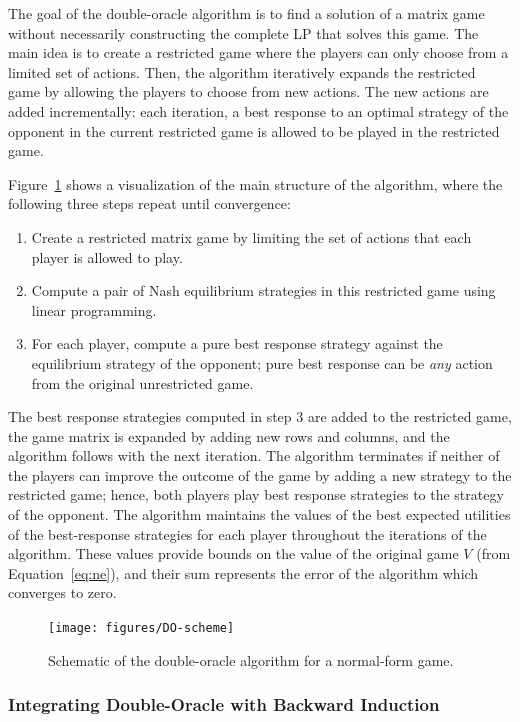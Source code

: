 The goal of the double-oracle algorithm is to find a solution of a matrix game without necessarily constructing the complete LP that solves this game.
The main idea is to create a restricted game where the players can only choose from a limited set of actions.
Then, the algorithm iteratively expands the restricted game by allowing the players to choose from new actions.
The new actions are added incrementally: each iteration, a best response to an optimal strategy of the opponent in the current restricted game is
allowed to be played in the restricted game.

Figure~\ref{fig:do-scheme} shows a visualization of the main structure of the algorithm, where the following three steps repeat until convergence:
\begin{enumerate}
\item Create a restricted matrix game by limiting the set of actions that each player is allowed to play.
\item Compute a pair of Nash equilibrium strategies in this restricted game using linear programming.
\item For each player, compute a pure best response strategy against the equilibrium strategy of the opponent; pure best response can be \emph{any} action from the original unrestricted game.
\end{enumerate}
The best response strategies computed in step 3 are added to the restricted game, the game matrix is expanded by adding new rows and columns, and the algorithm follows with the next iteration. The algorithm terminates if neither of the players can improve the outcome of the game by adding a new strategy to the restricted game; hence, both players play best response strategies to the strategy of the opponent. The algorithm maintains the values of the best expected utilities of the best-response strategies for each player throughout the iterations of the algorithm. These values provide bounds on the value of the original game $V$ (from Equation~\ref{eq:ne}), and their sum represents the error of the algorithm which converges to zero.

\begin{figure}[t!]
\centering
\texttt{[image: figures/DO-scheme]}
\caption{Schematic of the double-oracle algorithm for a normal-form game.}\label{fig:do-scheme}
\end{figure}

\subsubsection{Integrating Double-Oracle with Backward Induction}

